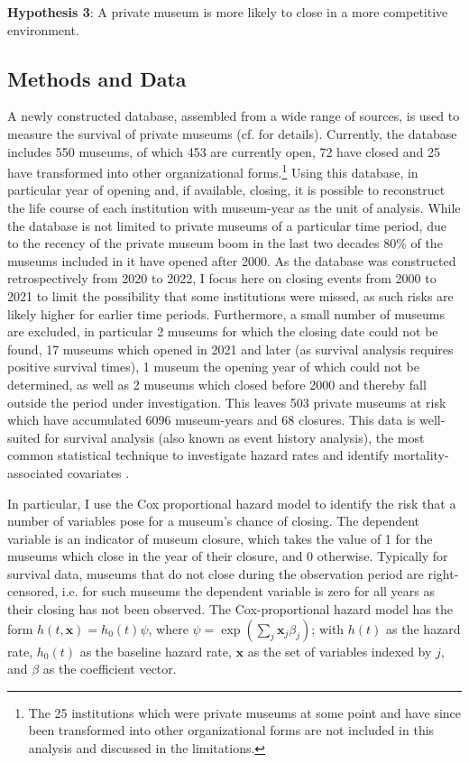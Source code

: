 \documentclass[12pt]{article}
\begin{document}
\textbf{Hypothesis 3}: A private museum is more likely to close in a more competitive environment.
\subsection*{Methods and Data}




A newly constructed database, assembled from a wide range of sources, is used to measure the survival of private museums (cf. \textcite{Velthuis_etal_2023_boom} for details).
Currently, the database includes 550 museums, of which 453 are currently open, 72 have closed and 25 have transformed into other organizational forms.\footnote{The 25 institutions which were private museums at some point and have since been transformed into other organizational forms are not included in this analysis and discussed in the limitations.}
Using this database, in particular year of opening and, if available, closing, it is possible to reconstruct the life course of each institution with museum-year as the unit of analysis.
While the database is not limited to private museums of a particular time period, due to the recency of the private museum boom in the last two decades 80\% of the museums included in it have opened after 2000.
As the database was constructed retrospectively from 2020 to 2022, I focus here on closing events from 2000 to 2021 to limit the possibility that some institutions were missed, as such risks are likely higher for earlier time periods.
Furthermore, a small number of museums are excluded, in particular 2 museums for which the closing date could not be found, 17 museums which opened in 2021 and later (as survival analysis requires positive survival times), 1 museum the opening year of which could not be determined, as well as 2 museums which closed before 2000 and thereby fall outside the period under investigation.
This leaves 503 private museums at risk which have accumulated 6096 museum-years and 68 closures.
This data is well-suited for survival analysis (also known as event history analysis), the most common statistical technique to investigate hazard rates and identify mortality-associated covariates \parencite{Moore_2015_survival,Allison_2014_event}.



In particular, I use the Cox proportional hazard model to identify the risk that a number of variables pose for a museum's chance of closing. 
The dependent variable is an indicator of museum closure, which takes the value of 1 for the museums which close in the year of their closure, and 0 otherwise.
Typically for survival data, museums that do not close during the observation period are right-censored, i.e. for such museums the dependent variable is zero for all years as their closing has not been observed.
The Cox-proportional hazard model has the form \(h(t,\mathbf{x}) = h_0(t) \psi\), where \(\psi = \exp(\sum_{j} \mathbf{x}_j \beta_j)\); with \(h(t)\) as the hazard rate, \(h_0(t)\) as the baseline hazard rate, \(\mathbf{x}\) as the set of variables indexed by \(j\), and \(\beta\) as the coefficient vector.
\end{document}
